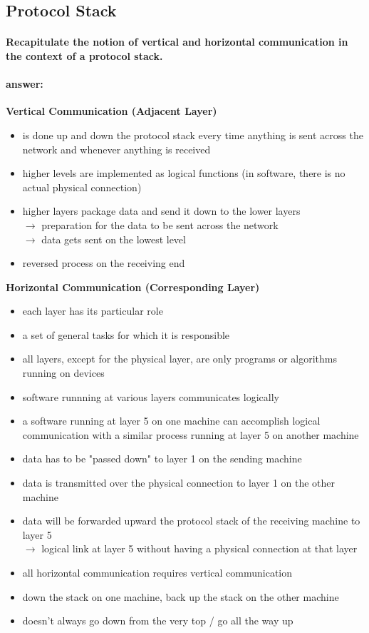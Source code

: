 \documentclass[a4paper,12pt]{article}
\begin{document}
 \subsection{Protocol Stack}
 \paragraph{Recapitulate the notion of vertical and horizontal communication in the context of a protocol stack.}
 \paragraph{answer:}
 
  \textbf{Vertical Communication (Adjacent Layer)}
 \begin{itemize}[itemsep=0pt]
 	\item  is done up and down the protocol stack every time anything is sent across the network and whenever anything is received
 	\item  higher levels are implemented as logical functions (in software, there is no actual physical connection)
 	\item  higher layers package data and send it down to the lower layers \\
 	$\rightarrow$ preparation for the data to be sent across the network \\
 	$\rightarrow$ data gets sent on the lowest level
 	\item  reversed process on the receiving end
 \end{itemize}
 
 
 \textbf{Horizontal Communication (Corresponding Layer)}
 \begin{itemize}[itemsep=0pt]
 	\item  each layer has its particular role \item  a set of general tasks for which it is responsible
 	\item  all layers, except for the physical layer, are only programs or algorithms running on devices
 	\item  software runnning at various layers communicates logically
 	\item  a software running at layer 5 on one machine can accomplish logical communication with a similar process running at layer 5 on another machine
 	\item  data has to be "passed down" to layer 1 on the sending machine
 	\item  data is transmitted over the physical connection to layer 1 on the other machine
 	\item  data will be forwarded upward the protocol stack of the receiving machine to layer 5 \\
 	$\rightarrow$ logical link at layer 5 without having a physical connection at that layer
 	\item  all horizontal communication requires vertical communication
 	\item  down the stack on one machine, back up the stack on the other machine
 	\item  doesn't always go down from the very top / go all the way up
 \end{itemize}
 
\end{document}
